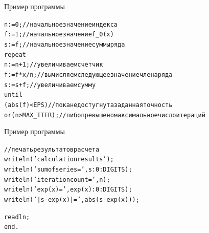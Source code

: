 \documentclass{beamer}
\begin{document}
\begin{frame}[fragile]{Пример программы}
\begin{alltt}
  n := 0; //начальное значение индекса
  f := 1; //начальное значение f_0(x)
  s := f; //начальное значение суммы ряда
  repeat
    n := n + 1; //увеличиваем счетчик
    f := f*x/n; //вычисляем следующее значение члена ряда
    s := s + f; //увеличиваем сумму
  until
    (abs(f) < EPS) //пока не достугнута заданная точность
    or (n > MAX_ITER); //либо превышено максимальное число итераций        
\end{alltt}
\end{frame}

\begin{frame}[fragile]{Пример программы}
\begin{alltt}
  //печать результатов расчета
  writeln('calculation results');
  writeln('  sum of series   = ', s:0:DIGITS);
  writeln('  iteration count = ', n);
  writeln('  exp(x)          = ', exp(x):0:DIGITS);
  writeln('  |s-exp(x)|      =', abs(s-exp(x)));

  readln;
end.
\end{alltt}
\end{frame}

\end{document}
